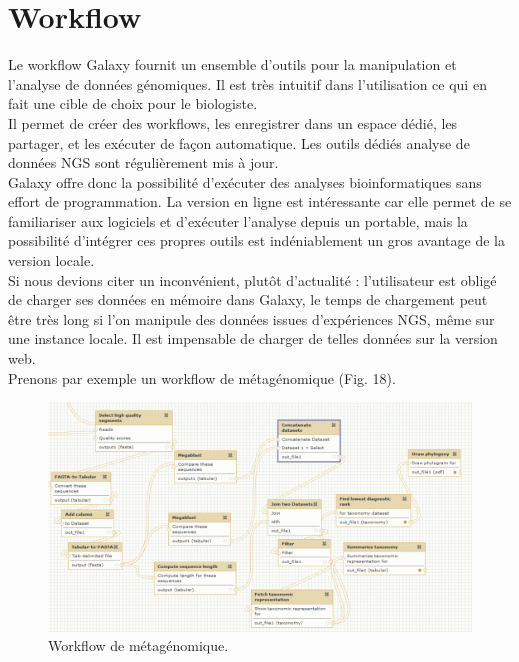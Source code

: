 \section{Workflow}

Le workflow Galaxy fournit un ensemble d’outils pour la manipulation et l’analyse de données génomiques. Il est très intuitif dans l’utilisation ce qui en fait une cible de choix pour le biologiste.\\


Il permet de créer des workflows, les enregistrer dans un espace dédié, les partager, et les exécuter de façon automatique. Les outils dédiés analyse de données NGS sont régulièrement mis à jour.\\


Galaxy offre donc la possibilité d’exécuter des analyses bioinformatiques sans effort de programmation. La version en ligne est intéressante car elle permet de se familiariser aux logiciels et d'exécuter l’analyse depuis un portable, mais la possibilité d’intégrer ces propres outils est indéniablement un gros avantage de la version locale.\\

Si nous devions citer un inconvénient, plutôt d’actualité : l’utilisateur est obligé de charger ses données en mémoire dans Galaxy, le temps de chargement peut être très long si l’on manipule des données issues d’expériences NGS, même sur une instance locale. Il est impensable de charger de telles données sur la version web.\\

Prenons par exemple un workflow de métagénomique (Fig. 18).\\

\begin{figure}[!h]
 \centering
\includegraphics[scale=0.4]{Images/metagenomics.png}
\caption{Workflow de métagénomique.}
\end{figure}

